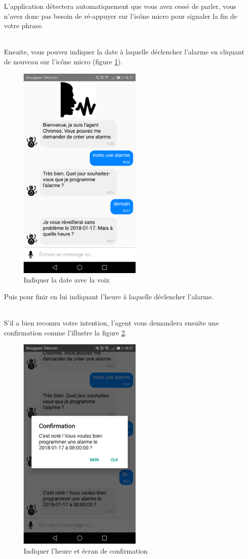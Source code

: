 L'application détectera automatiquement que vous avez cessé de parler, vous n'avez donc pas besoin de ré-appuyer sur l'icône micro pour signaler la fin de votre phrase.

~\\\indent Ensuite, vous pouvez indiquer la date à laquelle déclencher l'alarme en cliquant de nouveau sur l'icône micro (figure \ref{D}).

\begin{figure}[H]
  \centering
  \includegraphics[width=6cm]{images/D.png}
  \caption{Indiquer la date avec la voix}
  \label{D}
\end{figure}

Puis pour finir en lui indiquant l'heure à laquelle déclencher l'alarme. 

~\\\indent S'il a bien reconnu votre intention, l'agent vous demandera ensuite une confirmation comme l'illustre la figure \ref{E}.

\begin{figure}[H]
  \centering
  \includegraphics[width=6cm]{images/E.png}
  \caption{Indiquer l'heure et écran de confirmation}
  \label{E}
\end{figure}


